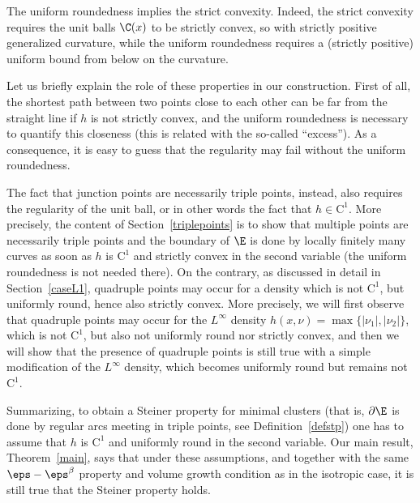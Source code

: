 The uniform roundedness implies the strict convexity. Indeed, the strict convexity requires the unit balls $\C(x)$ to be strictly convex, so with strictly positive generalized curvature, while the uniform roundedness requires a (strictly positive) uniform bound from below on the curvature.

Let us briefly explain the role of these properties in our construction. First of all, the shortest path between two points close to each other can be far from the straight line if $h$ is not strictly convex, and the uniform roundedness is necessary to quantify this closeness (this is related with the so-called ``excess''). As a consequence, it is easy to guess that the regularity may fail without the uniform roundedness.

The fact that junction points are necessarily triple points, instead, also requires the regularity of the unit ball, or in other words the fact that $h\in \mathrm{C}^1$. More precisely, the content of Section~\ref{triplepoints} is to show that multiple points are necessarily triple points and the boundary of $\E$ is done by locally finitely many curves as soon as $h$ is $\mathrm{C}^1$ and strictly convex in the second variable (the uniform roundedness is not needed there). On the contrary, as discussed in detail in Section~\ref{caseL1}, quadruple points may occur for a density which is not $\mathrm{C}^1$, but uniformly round, hence also strictly convex. More precisely, we will first observe that quadruple points may occur for the $L^\infty$ density $h(x,\nu)=\max\{|\nu_1|,|\nu_2|\}$, which is not $\mathrm{C}^1$, but also not uniformly round nor strictly convex, and then we will show that the presence of quadruple points is still true with a simple modification of the $L^\infty$ density, which becomes uniformly round but remains not $\mathrm{C}^1$.

Summarizing, to obtain a Steiner property for minimal clusters (that is, $\partial\E$ is done by regular arcs meeting in triple points, see Definition~\ref{defstp}) one has to assume that $h$ is $\mathrm{C}^1$ and uniformly round in the second variable. Our main result, Theorem~\ref{main}, says that under these assumptions, and together with the same $\eps-\eps^\beta$ property and volume growth condition as in the isotropic case, it is still true that the Steiner property holds.

